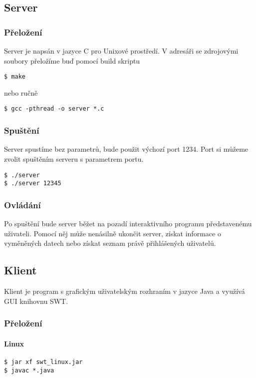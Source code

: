 \documentclass[12pt,titlepage]{article}
\begin{document}
\subsection{Server}
\subsubsection{Přeložení}
Server je napsán v jazyce C pro Unixové prostředí. V adresáři se zdrojovými
soubory přeložíme buď pomocí build skriptu
\begin{verbatim}
$ make
\end{verbatim}

nebo ručně
\begin{verbatim}
$ gcc -pthread -o server *.c
\end{verbatim}

\subsubsection{Spuštění}
Server spustíme bez parametrů, bude použit výchozí port 1234. Port si můžeme zvolit spuštěním serveru s parametrem portu.

\begin{verbatim}
$ ./server
$ ./server 12345
\end{verbatim}

\subsubsection{Ovládání}
Po spuštění bude server běžet na pozadí interaktivního programu představenému
uživateli. Pomocí něj může nenásilně ukončit server, získat informace o
vyměněných datech nebo získat seznam právě přihlášených uživatelů.


\subsection{Klient}
Klient je program s grafickým uživatelským rozhraním v jazyce Java a využívá
GUI knihovnu SWT.
\subsubsection{Přeložení}
\paragraph{Linux}
\begin{verbatim}
$ jar xf swt_linux.jar
$ javac *.java
\end{verbatim}
\end{document}
